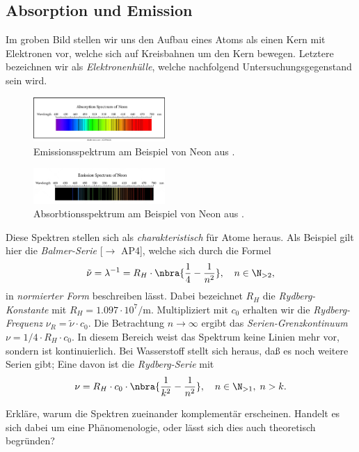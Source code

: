 \documentclass{subfiles}
\begin{document}
\subsection{Absorption und Emission}
    Im groben Bild stellen wir uns den Aufbau eines Atoms als einen Kern mit Elektronen vor, welche sich auf Kreisbahnen um den Kern bewegen. Letztere bezeichnen wir als \emph{Elektronenhülle}, welche nachfolgend Untersuchungsgegenstand sein wird. 

    \begin{figure}[H]
        \centering
        \includegraphics[width=5cm]{Bilddateien/AbsorbtionsspektrumNeon.png}
        \caption{Emissionsspektrum am Beispiel von Neon aus \cite{sutterstock:AbsorbtionNeon}.}
    \end{figure}

    \begin{figure}[H]
        \centering
        \includegraphics[width=5cm]{Bilddateien/EmissionsspektrumNeon-transformed.png}
        \caption{Absorbtionsspektrum am Beispiel von Neon aus \cite{sutterstock:EmissionNeon}.}
    \end{figure}
    Diese Spektren stellen sich als \emph{charakteristisch} für Atome heraus. Als Beispiel gilt hier die \emph{Balmer-Serie} [$\to$ AP4], welche sich durch die Formel
    \[\tilde\nu = \lambda^{-1} = R_H\cdot\nbra{\frac{1}{4} - \frac{1}{n^2}},\quad n\in\N_{>2},\]
    in \emph{normierter Form} beschreiben lässt. Dabei bezeichnet $R_H$ die \emph{Rydberg-Konstante} mit $R_H = 1.097\cdot 10^7\si{\per\meter}$. Multipliziert mit $c_0$ erhalten wir die \emph{Rydberg-Frequenz} $\nu_R = \tilde\nu\cdot c_0$. Die Betrachtung $n\to\infty$ ergibt das \emph{Serien-Grenzkontinuum} $\nu = 1/4\cdot R_H\cdot c_0$. In diesem Bereich weist das Spektrum keine Linien mehr vor, sondern ist kontinuierlich. Bei Wasserstoff stellt sich heraus, daß es noch weitere Serien gibt; Eine davon ist die \emph{Rydberg-Serie} mit
    \[\nu = R_H\cdot c_0\cdot \nbra{\frac{1}{k^2} - \frac{1}{n^2}},\quad n\in\N_{>1},\; n>k.\] 
    
    
    \begin{Aufgabe}
        \nr{} Erkläre, warum die Spektren zueinander komplementär erscheinen. Handelt es sich dabei um eine Phänomenologie, oder lässt sich dies auch theoretisch begründen?
    \end{Aufgabe}
\end{document}
